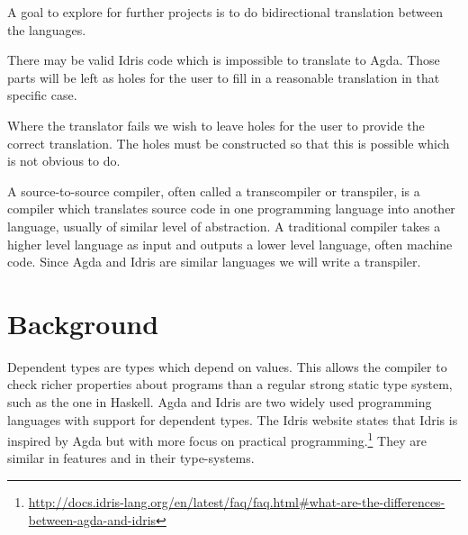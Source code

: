 \documentclass[parskip=half]{scrartcl}
\begin{document}
A goal to explore for further projects is to do bidirectional translation
between the languages.


There may be valid Idris code which is impossible to translate to Agda.  Those
parts will be left as holes for the user to fill in a reasonable translation in
that specific case.

Where the translator fails we wish to leave holes for the user to provide the
correct translation.
The holes must be constructed so that this is possible
which is not obvious to do.



A source-to-source compiler, often called a transcompiler or transpiler, is
a compiler which translates source code in one programming language into
another language, usually of similar level of abstraction. A traditional
compiler takes a higher level language as input and outputs a lower level
language, often machine code.  Since Agda and Idris are similar languages we will write a transpiler.






\section{Background}


Dependent types are types which depend on values. This allows the compiler to
check richer properties about programs than a regular strong static type
system, such as the one in Haskell.
Agda and Idris are two widely used programming languages with support for dependent types.
The Idris website states that Idris is inspired
by Agda but with more focus on practical
programming.\footnote{\url{http://docs.idris-lang.org/en/latest/faq/faq.html\#what-are-the-differences-between-agda-and-idris}}
They are similar in features and in their type-systems.
\end{document}
